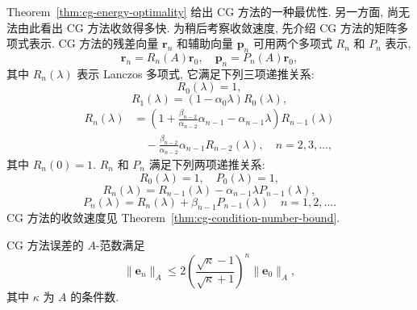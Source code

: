 {Theorem\ \ref{thm:cg-energy-optimality} 给出 CG 方法的一种最优性. 另一方面, 尚无法由此看出 CG 方法收敛得多快. 为稍后考察收敛速度, 先介绍 CG 方法的矩阵多项式表示. CG 方法的残差向量 $\bm r_n$ 和辅助向量 $\bm p_n$ 可用两个多项式 $R_n$ 和 $P_n$ 表示,}
\begin{equation}\label{eq:cg-residual-direction-polynomials}\bm r_n=R_n(A)\bm r_0,\quad\bm p_n=P_n(A)\bm r_0,\end{equation}
{其中 $R_n(\lambda)$ 表示 Lanczos 多项式, 它满足下列三项递推关系:}
\begin{equation}\label{eq:cg-polynomial-initial-zero}R_0(\lambda)=1,\end{equation}
\begin{equation}\label{eq:cg-polynomial-initial-one}R_1(\lambda)=(1-\alpha_0\lambda)R_0(\lambda),\end{equation}
\begin{equation}\label{eq:cg-polynomial-three-term}
\begin{aligned}R_n(\lambda)&=\left(1+\frac{\beta_{n-2}}{\alpha_{n-2}}\alpha_{n-1}-\alpha_{n-1}\lambda\right)R_{n-1}(\lambda)\\
&\quad-\frac{\beta_{n-2}}{\alpha_{n-2}}\alpha_{n-1}R_{n-2}(\lambda),\quad n=2,3,\ldots,
\end{aligned}\end{equation}
{其中 $R_n(0)=1$. $R_n$ 和 $P_n$ 满足下列两项递推关系:}
\begin{equation}\label{eq:cg-two-term-polynomial-initial}R_0(\lambda)=1,\quad P_0(\lambda)=1,\end{equation}
\begin{equation}\label{eq:cg-residual-polynomial-recurrence}R_n(\lambda)=R_{n-1}(\lambda)-\alpha_{n-1}\lambda P_{n-1}(\lambda),\end{equation}
\begin{equation}\label{eq:cg-direction-polynomial-recurrence}P_n(\lambda)=R_n(\lambda)+\beta_{n-1}P_{n-1}(\lambda)\quad n=1,2,\ldots.\end{equation}
{CG 方法的收敛速度见 Theorem\ \ref{thm:cg-condition-number-bound}.}
\begin{Theorem}\label{thm:cg-condition-number-bound}
{CG 方法误差的 $A$-范数满足}
\begin{equation}\label{eq:cg-condition-number-bound}
\|\bm e_n\|_A\le2\left(\frac{\sqrt\kappa-1}{\sqrt\kappa+1}\right)^n\|\bm e_0\|_A,
\end{equation}
{其中 $\kappa$ 为 $A$ 的条件数.}
\end{Theorem}
